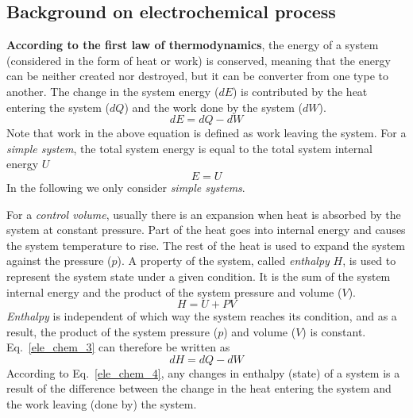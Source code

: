 \documentclass[12pt,a4paper]{scrartcl}
\begin{document}
\begin{onehalfspace}
\subsection{Background on electrochemical process}
\noindent\textbf{According to the first law of thermodynamics}, the energy of a system (considered in the form of heat or work) is conserved, meaning that the energy can be neither created nor destroyed, but it can be converter from one type to another. The change in the system energy ($dE$) is contributed by the heat entering the system ($dQ$) and the work done by the system ($dW$).
\begin{equation}\label{ele_chem_1}
	dE = dQ-dW
\end{equation}
Note that work in the above equation is defined as work leaving the system. For a \textit{simple system}, the total system energy is equal to the total system internal energy $U$
\begin{equation}\label{ele_chem_2}
	E=U
\end{equation}
In the following we only consider \textit{simple systems}.

For a \textit{control volume}, usually there is an expansion when heat is absorbed by the system at constant pressure. Part of the heat goes into internal energy and causes the system temperature to rise. The rest of the heat is used to expand the system against the pressure ($p$). A property of the system, called \textit{enthalpy} $H$, is used to represent the system state under a given condition. It is the sum of the system internal energy and the product of the system pressure and volume ($V$).
\begin{equation}\label{ele_chem_3}
	H = U + PV
\end{equation}
\textit{Enthalpy} is independent of which way the system reaches its condition, and as a result, the product of the system pressure ($p$) and volume ($V$) is constant. Eq.~\eqref{ele_chem_3} can therefore be written as
\begin{equation}\label{ele_chem_4}
	dH = dQ - dW
\end{equation}
According to Eq.~\eqref{ele_chem_4}, any changes in enthalpy (state) of a system is a result of the difference between the change in the heat entering the system and the work leaving (done by) the system.


\end{onehalfspace}
\end{document}
